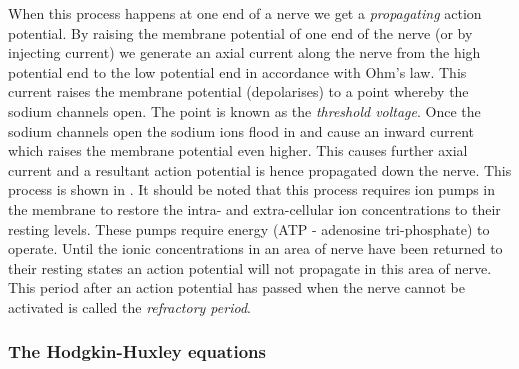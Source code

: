 When this process happens at one end of a nerve we get a \emph{propagating}
action potential. By raising the membrane potential of one end of the nerve
(or by injecting current) we generate an axial current along the nerve from
the high potential end to the low potential end in accordance with Ohm's law.
This current raises the membrane potential (depolarises) to a point whereby
the sodium channels open.  The point is known as the \emph{threshold voltage}.
Once the sodium channels open the sodium ions flood in and cause an inward
current which raises the membrane potential even higher. This causes further
axial current and a resultant action potential is hence propagated down the
nerve. This process is shown in . It should be noted
that this process requires ion pumps in the membrane to restore the intra- and
extra-cellular ion concentrations to their resting levels. These pumps require
energy (ATP - adenosine tri-phosphate) to operate. Until the ionic
concentrations in an area of nerve have been returned to their resting states
an action potential will not propagate in this area of nerve. This period
after an action potential has passed when the nerve cannot be activated is
called the \emph{refractory period}.


\subsubsection{The Hodgkin-Huxley equations}

